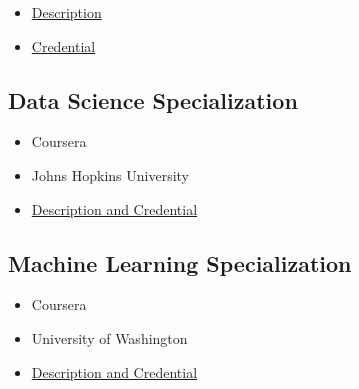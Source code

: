 \documentclass[
]{article}
\providecommand{\tightlist}{%
  \setlength{\itemsep}{0pt}\setlength{\parskip}{0pt}}
\begin{document}
\begin{itemize}
\tightlist
\item
  \href{https://aws.amazon.com/certification/certified-cloud-practitioner/}{Description}
\item
  \href{https://www.youracclaim.com/badges/32350702-5891-436d-a581-f5428aab3ad5/public_url}{Credential}
\end{itemize}

\hypertarget{data-science-specialization}{%
\subsection{Data Science
Specialization}\label{data-science-specialization}}

\begin{itemize}
\tightlist
\item
  Coursera
\item
  Johns Hopkins University
\item
  \href{https://www.coursera.org/account/accomplishments/specialization/certificate/KH5MS3AGYLHT}{Description
  and Credential}
\end{itemize}

\hypertarget{machine-learning-specialization}{%
\subsection{Machine Learning
Specialization}\label{machine-learning-specialization}}

\begin{itemize}
\tightlist
\item
  Coursera
\item
  University of Washington
\item
  \href{https://www.coursera.org/account/accomplishments/specialization/QXC4X9QML6EW}{Description
  and Credential}
\end{itemize}
\end{document}
